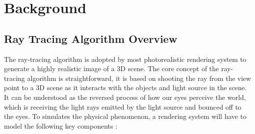 
\chapter{Background}
\label{ch:background}
\setcounter{figure}{1}      %

\section{Ray Tracing Algorithm Overview}

The ray-tracing algorithm is adopted by most photorealistic rendering system to generate a highly realistic image of a 3D scene. The core concept of the ray-tracing algorithm is straightforward, it is based on shooting the ray from the view point to a 3D scene as it interacts with the objects and light source in the scene. It can be understood as the reversed process of how our eyes perceive the world, which is receiving the light rays emitted by the light source and bounced off to the eyes. To simulates the physical phenomenon, a rendering system will have to model  the following key components : 

